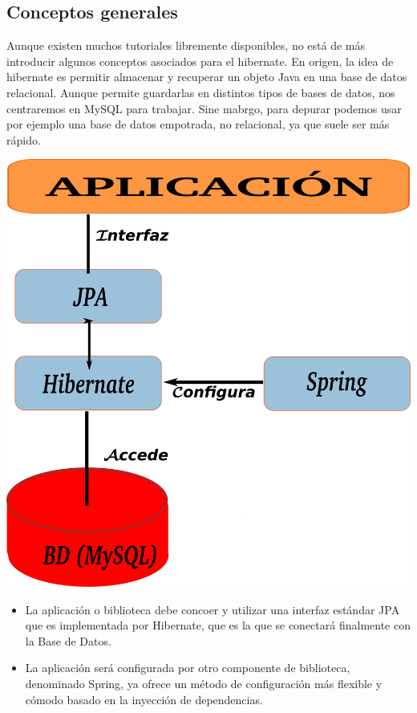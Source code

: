 \documentclass[11pt]{article}
\begin{document}
\subsection{Conceptos generales}
\label{sec-6-1}


Aunque existen muchos tutoriales libremente disponibles, no está de más
introducir algunos conceptos asociados para el hibernate.
En origen, la idea de hibernate es permitir almacenar y recuperar un
objeto Java en una base de datos relacional. Aunque permite guardarlas en distintos
tipos de bases de datos, nos centraremos en MySQL para trabajar.
Sine mabrgo, para depurar podemos usar por ejemplo una base de datos empotrada, no relacional, ya que suele ser más rápido.

\begin{center}
\includegraphics[width=.6\textwidth]{esquemahibernate.pdf}
\end{center}

\begin{itemize}

\item La aplicación o biblioteca debe concoer y utilizar una interfaz estándar JPA que es implementada por Hibernate, que es la que se conectará finalmente con la Base de Datos.

\item La aplicación será configurada por otro componente de biblioteca, denominado Spring, ya ofrece un método de configuración más flexible y cómodo basado en la inyección de dependencias.

\end{itemize}
\end{document}
